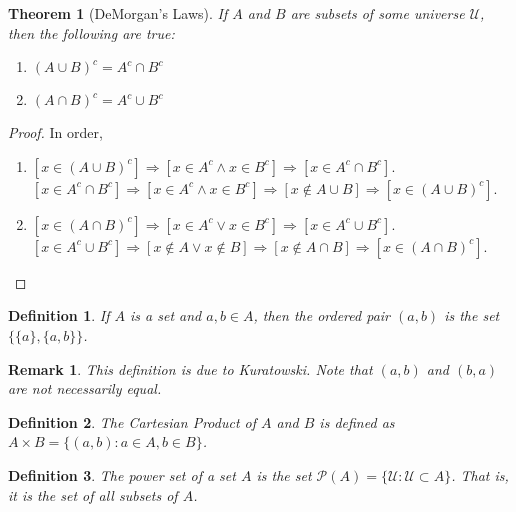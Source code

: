 \documentclass[crop=false,class=book]{standalone}
\theoremstyle{mystyle}
\newtheorem{theorem}{Theorem}[section]
\newtheorem{definition}{Definition}[section]
\newtheorem{remark}{Remark}[section]
\begin{document}
\begin{theorem}[DeMorgan's Laws]
If $A$ and $B$ are subsets of some universe $\mathcal{U}$, then the following are true:
\begin{enumerate}
\item $(A\cup B)^c = A^c \cap B^c$
\item $(A\cap B)^c = A^c \cup B^c$
\end{enumerate}
\end{theorem}
\begin{proof}
In order,
\begin{enumerate}
\item $[x\in (A\cup B)^c]\Rightarrow [x\in A^c\land x\in B^c]\Rightarrow [x\in A^c\cap B^c]$. $[x\in A^c \cap B^c]\Rightarrow [x\in A^c\land x\in B^c]\Rightarrow [x\notin A\cup B]\Rightarrow [x\in (A\cup B)^c]$.
\item $[x\in (A\cap B)^c]\Rightarrow [x\in A^c\lor x\in B^c]\Rightarrow [x\in A^c \cup B^c]$. $[x\in A^c \cup B^c]\Rightarrow [x\notin A\lor x\notin B]\Rightarrow [x\notin A\cap B]\Rightarrow [x\in (A\cap B)^c]$.
\end{enumerate}
\end{proof}
\begin{definition}
If $A$ is a set and $a,b\in A$, then the ordered pair $(a,b)$ is the set $\{\{a\},\{a,b\}\}$.
\end{definition}
\begin{remark}
This definition is due to Kuratowski. Note that $(a,b)$ and $(b,a)$ are not necessarily equal.
\end{remark}
\begin{definition}
The Cartesian Product of $A$ and $B$ is defined as $A\times B = \{(a,b):a\in A, b\in B\}$.
\end{definition}
\begin{definition}
The power set of a set $A$ is the set $\mathcal{P}(A) = \{\mathcal{U}:\mathcal{U}\subset A\}$. That is, it is the set of all subsets of $A$.
\end{definition}
\end{document}

